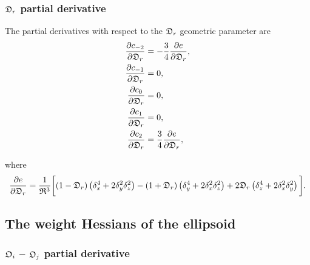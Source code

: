 \subsubsection{$\mathfrak{D}_r$ partial derivative}

The partial derivatives with respect to the $\mathfrak{D}_r$ geometric parameter are
\begin{subequations}
\begin{align}
    \frac{\partial c_{-2}}{\partial \mathfrak{D}_r} &= -\frac{3}{4} \frac{\partial e}{\partial \mathfrak{D}_r}, \\
    \frac{\partial c_{-1}}{\partial \mathfrak{D}_r} &= 0, \\
    \frac{\partial c_{0}}{\partial \mathfrak{D}_r}  &= 0, \\
    \frac{\partial c_{1}}{\partial \mathfrak{D}_r}  &= 0, \\
    \frac{\partial c_{2}}{\partial \mathfrak{D}_r}  &= \frac{3}{4} \frac{\partial e}{\partial \mathfrak{D}_r},
\end{align}
\end{subequations}

\noindent where
\begin{equation}
    \frac{\partial e}{\partial \mathfrak{D}_r} = \frac{1}{\mathfrak{R}^3} \bigg[ (1 - \mathfrak{D}_r) \left(\delta_x^4 + 2\delta_y^2\delta_z^2\right)
        - (1 + \mathfrak{D}_r) \left(\delta_y^4 + 2\delta_x^2\delta_z^2\right) + 2 \mathfrak{D}_r \left(\delta_z^4 + 2\delta_x^2\delta_y^2\right) \bigg].
\end{equation}




\newpage
\subsection{The weight Hessians of the ellipsoid}


\subsubsection{$\mathfrak{O}_i$ -- $\mathfrak{O}_j$ partial derivative}

